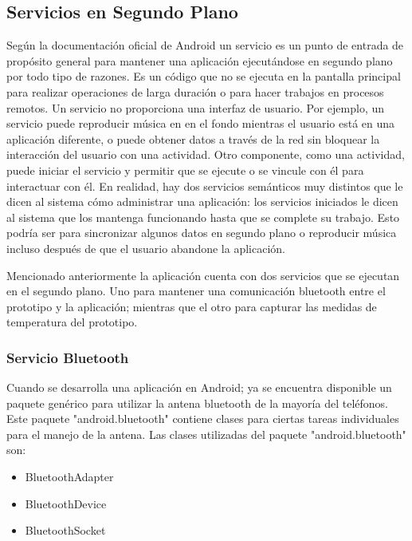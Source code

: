 \subsection{Servicios en Segundo Plano}

\par 
Según la documentación oficial de Android un servicio es un punto de entrada de propósito general para mantener una aplicación ejecutándose en segundo plano por todo tipo de razones. Es un código que no se ejecuta en la pantalla principal para realizar operaciones de larga duración o para hacer trabajos en procesos remotos. Un servicio no proporciona una interfaz de usuario. Por ejemplo, un servicio puede reproducir música en en el fondo mientras el usuario está en una aplicación diferente, o puede obtener datos a través de la red sin bloquear la interacción del usuario con una actividad. Otro componente, como una actividad, puede iniciar el servicio y permitir que se ejecute o se vincule con él para interactuar con él. En realidad, hay dos servicios semánticos muy distintos que le dicen al sistema cómo administrar una aplicación: los servicios iniciados le dicen al sistema que los mantenga funcionando hasta que se complete su trabajo. Esto podría ser para sincronizar algunos datos en segundo plano o reproducir música incluso después de que el usuario abandone la aplicación.\cite{androidapp}

\par \noindent
Mencionado anteriormente la aplicación cuenta con dos servicios que se ejecutan en el segundo plano. Uno para mantener una comunicación bluetooth entre el prototipo y la aplicación; mientras que el otro para capturar las medidas de temperatura del prototipo. 

\subsubsection{Servicio Bluetooth}

\par \noindent
Cuando se desarrolla una aplicación en Android; ya se encuentra disponible un paquete genérico para utilizar la antena bluetooth de la mayoría del teléfonos. Este paquete "android.bluetooth" contiene clases para ciertas tareas individuales para el manejo de la antena. Las clases utilizadas del paquete "android.bluetooth" son:

\begin{itemize}
	\item BluetoothAdapter
	
	\item BluetoothDevice
	
	\item BluetoothSocket
\end{itemize}

